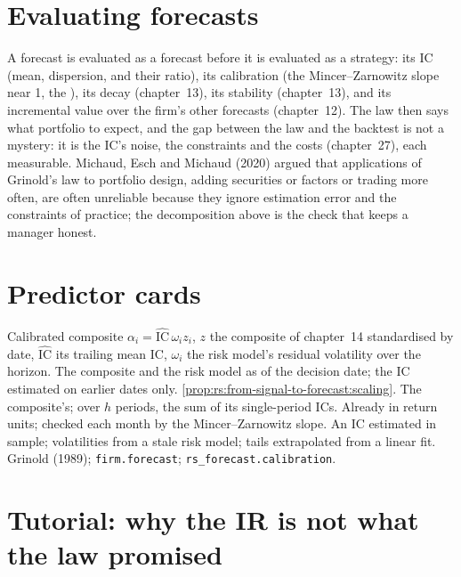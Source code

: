 \section{Evaluating forecasts}

A forecast is evaluated as a forecast before it is evaluated as a strategy: its IC (mean, dispersion, and their ratio), its calibration (the
Mincer--Zarnowitz slope near 1, the ), its decay (chapter~13), its stability (chapter~13), and its incremental value over the
firm's other forecasts (chapter~12). The law then says what portfolio to expect, and the gap between the law and the backtest is not a mystery: it
is the IC's noise, the constraints and the costs (chapter~27), each measurable. Michaud, Esch and Michaud (2020) argued that applications of
Grinold's law to portfolio design, adding securities or factors or trading more often, are often unreliable because they ignore estimation error and
the constraints of practice; the decomposition above is the check that keeps a manager honest.

\section{Predictor cards}

\begin{predictorcard}{Calibrated composite}\label{pred:rs:from-signal-to-forecast:calibrated}
 $\alpha_i = \widehat{\mathrm{IC}}\,\omega_i z_i$, $z$ the composite of chapter~14 standardised by date, $\widehat{\mathrm{IC}}$ its trailing
mean IC, $\omega_i$ the risk model's residual volatility over the horizon.
 The composite and the risk model as of the decision date; the IC estimated on earlier dates only.
 \cref{prop:rs:from-signal-to-forecast:scaling}.
 The composite's; over $h$ periods, the sum of its single-period ICs.
 Already in return units; checked each month by the Mincer--Zarnowitz slope.
 An IC estimated in sample; volatilities from a stale risk model; tails extrapolated from a linear fit.
 Grinold (1989); \texttt{firm.forecast}; \texttt{rs\_forecast.calibration}.
\end{predictorcard}

\section{Tutorial: why the IR is not what the law promised}\label{tut:rs:from-signal-to-forecast:tut}

